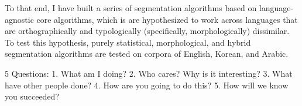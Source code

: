 To that end, I have built a series of segmentation algorithms based on language-agnostic core algorithms, which is are hypothesized to work across languages that are orthographically and typologically (specifically, morphologically) dissimilar. To test this hypothesis, purely statistical, morphological, and hybrid segmentation algorithms are tested on corpora of English, Korean, and Arabic.

5 Questions:
1. What am I doing?
2. Who cares? Why is it interesting?
3. What have other people done?
4. How are you going to do this?
5. How will we know you succeeded?